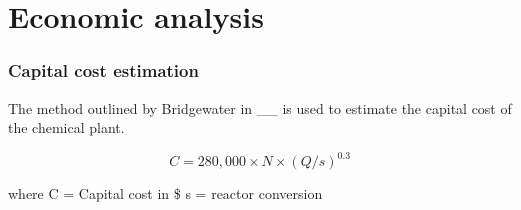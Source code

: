 
\section{Economic analysis}
\label{app:economics}
\subsubsection{Capital cost estimation}

The method outlined by Bridgewater in __ is used to estimate the capital cost of the chemical plant. 

\begin{equation}
    C=280,000 \times N \times (Q/s)^0.3
\end{equation}

where C = Capital cost in \$
s = reactor conversion